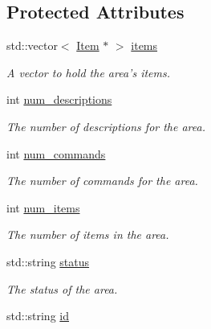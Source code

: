 \subsection*{\-Protected \-Attributes}
\begin{DoxyCompactItemize}
\item 
\hypertarget{class_area_a8fcfd7b9f54f722a6bf8c68ac26ea4f6}{
std\-::vector$<$ \hyperlink{class_item}{\-Item} $\ast$ $>$ \hyperlink{class_area_a8fcfd7b9f54f722a6bf8c68ac26ea4f6}{items}}
\label{class_area_a8fcfd7b9f54f722a6bf8c68ac26ea4f6}

\begin{DoxyCompactList}\small\item\em \-A vector to hold the area's items. \end{DoxyCompactList}\item 
\hypertarget{class_area_a4ec123111d0eb0346cc3fa55ee7328e9}{
int \hyperlink{class_area_a4ec123111d0eb0346cc3fa55ee7328e9}{num\-\_\-descriptions}}
\label{class_area_a4ec123111d0eb0346cc3fa55ee7328e9}

\begin{DoxyCompactList}\small\item\em \-The number of descriptions for the area. \end{DoxyCompactList}\item 
\hypertarget{class_area_a698aec5d64c6990033fd3b029c40c117}{
int \hyperlink{class_area_a698aec5d64c6990033fd3b029c40c117}{num\-\_\-commands}}
\label{class_area_a698aec5d64c6990033fd3b029c40c117}

\begin{DoxyCompactList}\small\item\em \-The number of commands for the area. \end{DoxyCompactList}\item 
\hypertarget{class_area_a29d6271cf822fe3c7865e249643b0728}{
int \hyperlink{class_area_a29d6271cf822fe3c7865e249643b0728}{num\-\_\-items}}
\label{class_area_a29d6271cf822fe3c7865e249643b0728}

\begin{DoxyCompactList}\small\item\em \-The number of items in the area. \end{DoxyCompactList}\item 
\hypertarget{class_area_ab5b23c6cefb5ff678f5544d7b5900b7b}{
std\-::string \hyperlink{class_area_ab5b23c6cefb5ff678f5544d7b5900b7b}{status}}
\label{class_area_ab5b23c6cefb5ff678f5544d7b5900b7b}

\begin{DoxyCompactList}\small\item\em \-The status of the area. \end{DoxyCompactList}\item 
\hypertarget{class_area_a71dbaaeab0c2f2d0ba296593e59b22ce}{
std\-::string \hyperlink{class_area_a71dbaaeab0c2f2d0ba296593e59b22ce}{id}}
\label{class_area_a71dbaaeab0c2f2d0ba296593e59b22ce}


\end{DoxyCompactItemize}
